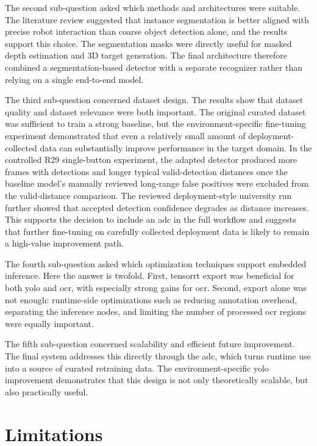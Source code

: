 The second sub-question asked which methods and architectures were suitable.
The literature review suggested that instance segmentation is better aligned with
precise robot interaction than coarse object detection alone, and the results
support this choice. The segmentation masks were directly useful for masked depth
estimation and 3D target generation. The final architecture therefore combined a
segmentation-based detector with a separate recognizer rather than relying on a
single end-to-end model.

The third sub-question concerned dataset design. The results show that dataset
quality and dataset relevance were both important. The original curated dataset
was sufficient to train a strong baseline, but the environment-specific
fine-tuning experiment demonstrated that even a relatively small amount of
deployment-collected data can substantially improve performance in the target
domain. In the controlled R29 single-button experiment, the adapted detector
produced more frames with detections and longer typical valid-detection
distances once the baseline model's manually reviewed long-range false positives
were excluded from the valid-distance comparison. The reviewed deployment-style
university run further showed that accepted detection confidence degrades as
distance increases. This supports the decision to include an \gls{adc} in the
full workflow and suggests that further fine-tuning on carefully collected
deployment data is likely to remain a high-value improvement path.

The fourth sub-question asked which optimization techniques support embedded
inference. Here the answer is twofold. First, \gls{tensorrt} export was
beneficial for both \gls{yolo} and \gls{ocr}, with especially strong gains for
\gls{ocr}. Second, export alone was not enough: runtime-side optimizations such
as reducing annotation overhead, separating the inference nodes, and limiting the
number of processed \gls{ocr} regions were equally important.

The fifth sub-question concerned scalability and efficient future improvement.
The final system addresses this directly through the \gls{adc}, which turns
runtime use into a source of curated retraining data. The environment-specific
\gls{yolo} improvement demonstrates that this design is not only theoretically
scalable, but also practically useful.

\section{Limitations}

